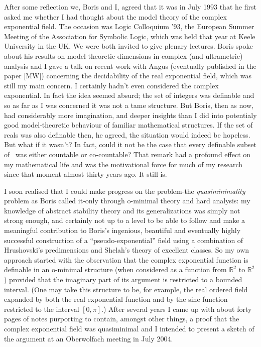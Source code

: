 \documentclass[12pt,nodate]{article}
\begin{document}
After some reflection we, Boris and I, agreed that it was in July 1993 that he first asked me whether I had thought about the model theory of the complex exponential field. The occasion was Logic Colloquium '93, the European Summer Meeting of the Association for Symbolic Logic, which was held that year at Keele University in the UK. We were both invited to give plenary lectures. Boris spoke about his results on model-theoretic dimensions in complex (and ultrametric) analysis and I gave a talk on recent work with Angus (eventually published in the paper [MW]) concerning the decidability of the real exponential field, which was still my main concern. I certainly hadn't even considered the complex exponential. In fact the idea seemed absurd; the set of integers was definable  and so as far as I was concerned it was not a tame structure. But Boris, then as now, had considerably more imagination, and deeper insights than I did into potentialy good model-theoretic behaviour of familiar mathematical structures. If the set of reals was also definable then, he agreed, the situation would indeed be hopeless. But what if it wasn't? In fact, could it not be the case that every definable subset of \C\ was either countable or co-countable? That remark had a profound effect on my mathematical life and was the motivational force for much of my research since that moment almost thirty years ago. It still is.

\vspace{3mm}

I soon realised that I could make progress on the problem-the \emph{quasiminimality} problem as Boris called it-only through o-minimal theory and hard analysis: my knowledge of abstract stability theory and its generalizations was simply not strong enough, and certainly not up to a level to be able to follow and make a meaningful contribution to Boris's ingenious, beautiful and eventually highly successful construction  of a ``pseudo-exponential'' field using a combination of Hrushovski's predimensions and Shelah's theory of excellent classes. So my own approach started with the observation that the complex exponential function is definable in an o-minimal structure (when considered as a function from $\mathbb{R}^{2}$ to $\mathbb{R}^{2}$) provided that the imaginary part of its argument is restricted to a bounded interval. (One may take this structure to be, for example, the real ordered field expanded by both the real exponential function and by the sine function restricted to the interval $[0, \pi]$.) After several years I came up with about forty pages of notes purporting to contain, amongst other things, a proof that the complex exponential field was quasiminimal and I intended to present a sketch of the argument at an Oberwolfach meeting in July 2004. 
\end{document}
